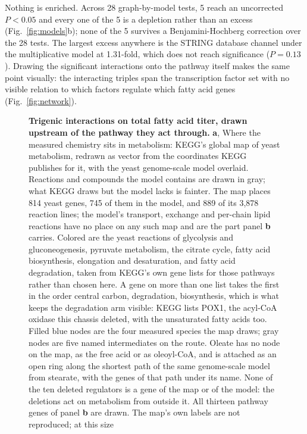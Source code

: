 Nothing is enriched. Across 28 graph-by-model tests, 5 reach an uncorrected $P < 0.05$ and
every one of the 5 is a depletion rather than an excess (Fig.~\ref{fig:models}b); none of
the 5 survives a Benjamini-Hochberg correction over the 28 tests. The largest excess anywhere
is the STRING database channel under the multiplicative model at 1.31-fold, which does not
reach significance ($P = 0.13$). Drawing the significant interactions onto the pathway
itself makes the same point visually: the interacting triples span the transcription factor
set with no visible relation to which factors regulate which fatty acid genes
(Fig.~\ref{fig:network}).

\begin{figure}[t]
\caption{\textbf{Trigenic interactions on total fatty acid
titer, drawn upstream of the pathway they act through.} \textbf{a}, Where the measured
chemistry sits in metabolism: KEGG's global map of yeast metabolism, redrawn as vector
from the coordinates KEGG publishes for it, with the yeast genome-scale model overlaid.
Reactions and compounds the model contains are drawn in gray; what KEGG draws but the
model lacks is fainter. The map places 814 yeast genes, 745 of them in the model, and 889
of its 3,878 reaction lines; the model's transport, exchange and per-chain lipid reactions
have no place on any such map and are the part panel \textbf{b} carries. Colored are the
yeast reactions of glycolysis and gluconeogenesis, pyruvate metabolism, the citrate
cycle, fatty acid biosynthesis, elongation and desaturation, and fatty acid degradation,
taken from KEGG's own gene lists for those pathways rather than chosen here. A gene on more
than one list takes the first in the order central carbon, degradation, biosynthesis, which
is what keeps the degradation arm visible: KEGG lists POX1, the acyl-CoA oxidase this
chassis deleted, with the unsaturated fatty acids too. Filled blue
nodes are the four measured species the map draws; gray nodes are five named
intermediates on the route. Oleate has no node on the map, as the free acid or as
oleoyl-CoA, and is attached as an open ring along the shortest path of the same
genome-scale model from stearate, with the genes of that path under its name. None of the
ten deleted regulators is a gene of the map or of the model: the deletions act on
metabolism from outside it. All thirteen pathway genes of
panel \textbf{b} are drawn. The map's own labels are not reproduced; at this size
}
\end{figure}
